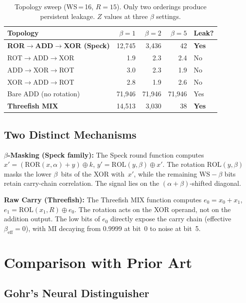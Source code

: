 \documentclass[conference,a4paper]{IEEEtran}
\begin{document}
\begin{table}[t]
\centering
\caption{Topology sweep (WS\,=\,16, $R{=}15$). Only two orderings produce persistent leakage. $Z$ values at three $\beta$ settings.}
\label{tab:topology}
\begin{tabular}{@{}lrrrl@{}}
\toprule
\textbf{Topology} & $\beta{=}1$ & $\beta{=}2$ & $\beta{=}5$ & \textbf{Leak?} \\
\midrule
\textbf{ROR$\to$ADD$\to$XOR (Speck)} & 12,745 & 3,436 & 42 & \textbf{Yes} \\
ROT$\to$ADD$\to$XOR & 1.9 & 2.3 & 2.4 & No \\
ADD$\to$XOR$\to$ROT & 3.0 & 2.3 & 1.9 & No \\
XOR$\to$ADD$\to$ROT & 2.8 & 1.9 & 2.6 & No \\
Bare ADD (no rotation) & 71,946 & 71,946 & 71,946 & Yes \\
\textbf{Threefish MIX} & 14,513 & 3,030 & 38 & \textbf{Yes} \\
\bottomrule
\end{tabular}
\end{table}

\subsection{Two Distinct Mechanisms}

\textbf{$\beta$-Masking (Speck family):} The Speck round function computes $x' = (\mathrm{ROR}(x, \alpha) + y) \oplus k$, $y' = \mathrm{ROL}(y, \beta) \oplus x'$. The rotation $\mathrm{ROL}(y, \beta)$ masks the lower $\beta$~bits of the XOR with~$x'$, while the remaining $\mathrm{WS}{-}\beta$ bits retain carry-chain correlation. The signal lies on the $(\alpha{+}\beta)$-shifted diagonal.

\textbf{Raw Carry (Threefish):} The Threefish MIX function computes $e_0 = x_0 + x_1$, $e_1 = \mathrm{ROL}(x_1, R) \oplus e_0$. The rotation acts on the XOR operand, not on the addition output. The low bits of $e_0$ directly expose the carry chain (effective $\beta_{\mathrm{eff}} = 0$), with MI decaying from 0.9999 at bit~0 to noise at bit~5.

\section{Comparison with Prior Art}

\subsection{Gohr's Neural Distinguisher}
\end{document}
